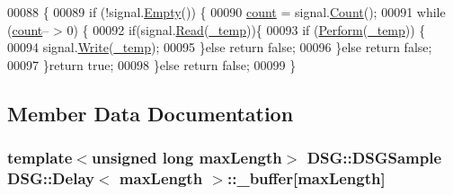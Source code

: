 \begin{DoxyCode}
00088                                                                  \{
00089         \textcolor{keywordflow}{if} (!signal.\hyperlink{class_d_s_g_1_1_ring_buffer_ac1346f5842d08b988a5297abe4089b96}{Empty}()) \{
00090             \hyperlink{class_d_s_g_1_1_delay_a1d54836950db9724434880d859d1e3ea}{count} = signal.\hyperlink{class_d_s_g_1_1_ring_buffer_a9bd79b0a6dff618b205e396c101ee070}{Count}();
00091             \textcolor{keywordflow}{while} (\hyperlink{class_d_s_g_1_1_delay_a1d54836950db9724434880d859d1e3ea}{count}-- > 0) \{
00092                 \textcolor{keywordflow}{if}(signal.\hyperlink{class_d_s_g_1_1_ring_buffer_a6b2848a64f15c7b0c320779582fa0fbe}{Read}(\hyperlink{class_d_s_g_1_1_delay_a039bb7a3a39aff5841b9e808cacc1a6e}{\_temp}))\{
00093                     \textcolor{keywordflow}{if} (\hyperlink{class_d_s_g_1_1_delay_afe853b73a1d7d1e5720277e5d956b209}{Perform}(\hyperlink{class_d_s_g_1_1_delay_a039bb7a3a39aff5841b9e808cacc1a6e}{\_temp})) \{
00094                         signal.\hyperlink{class_d_s_g_1_1_ring_buffer_aa5dd2caa0a270173251faee40a43d692}{Write}(\hyperlink{class_d_s_g_1_1_delay_a039bb7a3a39aff5841b9e808cacc1a6e}{\_temp});
00095                     \}\textcolor{keywordflow}{else} \textcolor{keywordflow}{return} \textcolor{keyword}{false};
00096                 \}\textcolor{keywordflow}{else} \textcolor{keywordflow}{return} \textcolor{keyword}{false};
00097             \}\textcolor{keywordflow}{return} \textcolor{keyword}{true};
00098         \}\textcolor{keywordflow}{else} \textcolor{keywordflow}{return} \textcolor{keyword}{false};
00099     \}
\end{DoxyCode}


\subsection{Member Data Documentation}
\hypertarget{class_d_s_g_1_1_delay_a8c86e03e9656476371f98d049ae1c5c9}{
\subsubsection[{\+\_\+buffer}]{\setlength{\rightskip}{0pt plus 5cm}template$<$unsigned long max\+Length$>$ {\bf D\+S\+G\+::\+D\+S\+G\+Sample} {\bf D\+S\+G\+::\+Delay}$<$ max\+Length $>$\+::\+\_\+buffer\mbox{[}max\+Length\mbox{]}\hspace{0.3cm}{\ttfamily [protected]}}}\label{class_d_s_g_1_1_delay_a8c86e03e9656476371f98d049ae1c5c9}


